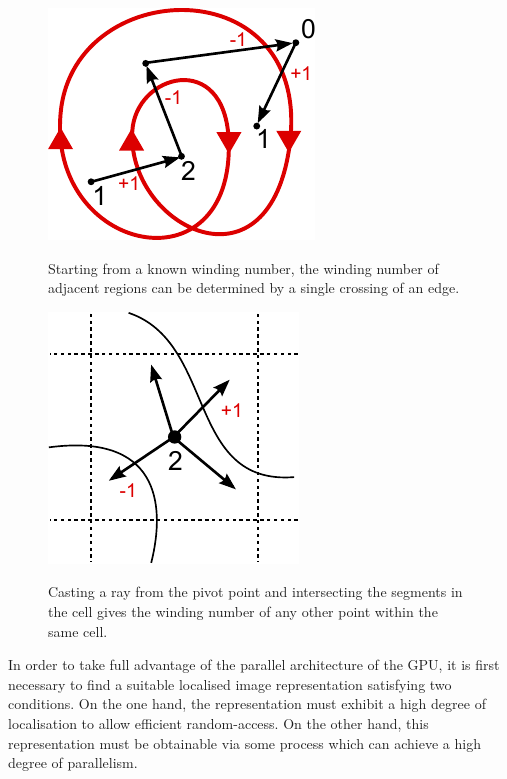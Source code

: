 \documentclass[11pt,a4paper,twoside]{article}
\begin{document}
\begin {figure} [ht]
\centering
\begin {minipage} [b] {0.45\linewidth}
	\centering
	\includegraphics [width=0.6\columnwidth]{figures/ray_our}
	\caption {Starting from a known winding number, the winding number of adjacent regions can be determined by a single crossing of an edge.}
	\label {fig:ray_our}
\end {minipage}
\hspace{0.5cm}
\begin{minipage} [b] {0.45\linewidth}
	\centering
	\includegraphics [width=0.6\columnwidth]{figures/cell}
	\caption {Casting a ray from the pivot point and intersecting the segments in the cell gives the winding number of any other point within the same cell.}
	\label {fig:cell}	
\end {minipage}
\end {figure}

In order to take full advantage of the parallel architecture of the GPU, it is first necessary to find a suitable localised image representation satisfying two conditions. On the one hand, the representation must exhibit a high degree of localisation to allow efficient random-access. On the other hand, this representation must be obtainable via some process which can achieve a high degree of parallelism. 
\end{document}
